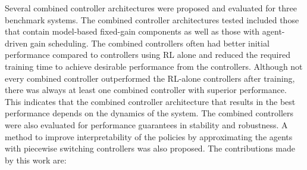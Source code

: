 Several combined controller architectures were proposed and evaluated for three benchmark systems. The combined controller architectures tested included those that contain model-based fixed-gain components as well as those with agent-driven gain scheduling. The combined controllers often had better initial performance compared to controllers using RL alone and reduced the required training time to achieve desirable performance from the controllers. Although not every combined controller outperformed the RL-alone controllers after training, there was always at least one combined controller with superior performance. This indicates that the combined controller architecture that results in the best performance depends on the dynamics of the system. The combined controllers were also evaluated for performance guarantees in stability and robustness. A method to improve interpretability of the policies by approximating the agents with piecewise switching controllers was also proposed. The contributions made by this work are:
%

